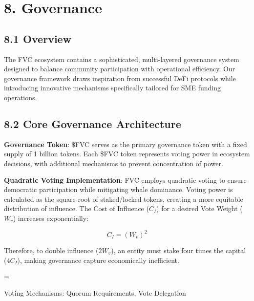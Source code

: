 \documentclass[
  paper=a4,
  ,captions=tableheading
]{scrartcl}
\begin{document}
\section{8. Governance}\label{governance-section}

\subsection{8.1 Overview}\label{overview}

The FVC ecosystem contains a sophisticated, multi-layered governance
system designed to balance community participation with operational
efficiency. Our governance framework draws inspiration from successful
DeFi protocols while introducing innovative mechanisms specifically
tailored for SME funding operations.

\subsection{8.2 Core Governance
Architecture}\label{core-governance-architecture}

\textbf{Governance Token}: \$FVC serves as the primary governance token
with a fixed supply of 1 billion tokens. Each \$FVC token represents
voting power in ecosystem decisions, with additional mechanisms to
prevent concentration of power.

\textbf{Quadratic Voting Implementation}: FVC employs quadratic
voting to ensure democratic participation while mitigating whale
dominance. Voting power is calculated as the square root of
staked/locked tokens, creating a more equitable distribution of
influence. The Cost of Influence ($C_I$) for a desired Vote Weight ($W_v$) increases exponentially:

\[
C_I = (W_v)^2
\]

Therefore, to double influence ($2W_v$), an entity must stake four times the capital ($4C_I$), making governance capture economically inefficient.

\begin{center}
 = 
\end{center}

{Voting Mechanisms: Quorum Requirements, Vote
Delegation}\label{voting-mechanisms-quorum-requirements-vote-delegation}
\end{document}
